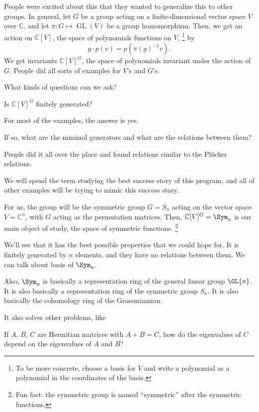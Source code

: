 People were excited about this that they wanted to generalize this to other groups.
In general, let \(G\) be a group acting on a finite-dimensional vector space \(V\) over \(\mathbb{C}\), and let \(\pi \colon G \mapsto \operatorname{GL}(V)\) be a group homomorphism.
Then, we get an action on \(\mathbb{C}[V]\), the space of polynomials functions on \(V\),%
\footnote{To be more concrete, choose a basis for \(V\) and write a polynomial as a polynomial in the coordinates of the basis.}
by 
\begin{equation}
    g \cdot p(v) = p(\pi(g)^{-1}v).
\end{equation}
We get invariants \(\mathbb{C}[V]^G\), the space of polynomials invariant under the action of \(G\).
People did all sorts of examples for \(V\)'s and \(G\)'s.

What kinds of questions can we ask?

\begin{question}
    Is \(\mathbb{C}[V]^G\) finitely generated?
\end{question}

For most of the examples, the answer is yes.

\begin{question}
    If so, what are the minimal generators and what are the relations between them?
\end{question}

People did it all over the place and found relations similar to the Plücker relations.

We will spend the term studying the best success story of this program,
and all of other examples will be trying to mimic this success story.

For us, the group will be the symmetric group \(G = S_n\) acting on the vector space \(V = \mathbb{C}^n\), with \(G\) acting as the permutation matrices.
Then, \(\mathbb{C}[V]^G = \Sym_n\) is our main object of study, the space of symmetric functions.%
\footnote{Fun fact: the symmetric group is named ``symmetric'' after the symmetric functions.}

We'll see that it has the best possible properties that we could hope for.
It is finitely generated by \(n\) elements, and they have no relations between them.
We can talk about basis of \(\Sym_n\).

Also, \(\Sym_n\) is basically a representation ring of the general linear group \(\GL{n}\).
It is also basically a representation ring of the symmetric group \(S_n\).
It is also basically the cohomology ring of the Grassmannian.

It also solves other problems, like
\begin{question}
    If \(A\), \(B\), \(C\) are Hermitian matrices
    with \(A + B = C\),
    how do the eigenvalues of \(C\) depend on the eigenvalues of \(A\) and \(B\)?
\end{question}
